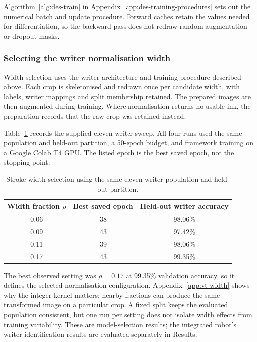 Algorithm~\ref{alg:des-train} in Appendix~\ref{app:des-training-procedures} sets out the numerical batch and update procedure. Forward caches retain the values needed for differentiation, so the backward pass does not redraw random augmentation or dropout masks.

\subsubsection{Selecting the writer normalisation width}
Width selection uses the writer architecture and training procedure described above. Each crop is skeletonised and redrawn once per candidate width, with labels, writer mappings and split membership retained. The prepared images are then augmented during training. Where normalisation returns no usable ink, the preparation records that the raw crop was retained instead.

Table~\ref{tab:des-widthselection} records the supplied eleven-writer sweep. All four runs used the same population and held-out partition, a 50-epoch budget, and framework training on a Google Colab T4 GPU. The listed epoch is the best saved epoch, not the stopping point.

\begin{table}[!htbp]\centering\small
\begin{tabular}{|c|c|c|}
\hline\textbf{Width fraction $\rho$}&\textbf{Best saved epoch}&\textbf{Held-out writer accuracy}\\\hline
0.06&38&98.06\%\\\hline
0.09&43&97.42\%\\\hline
0.11&39&98.06\%\\\hline
0.17&43&99.35\%\\\hline
\end{tabular}
\caption{Stroke-width selection using the same eleven-writer population and held-out partition.}
\label{tab:des-widthselection}
\end{table}

The best observed setting was $\rho=0.17$ at 99.35\% validation accuracy, so it defines the selected normalisation configuration. Appendix~\ref{app:vt-width} shows why the integer kernel matters: nearby fractions can produce the same transformed image on a particular crop. A fixed split keeps the evaluated population consistent, but one run per setting does not isolate width effects from training variability. These are model-selection results; the integrated robot's writer-identification results are evaluated separately in Results.

